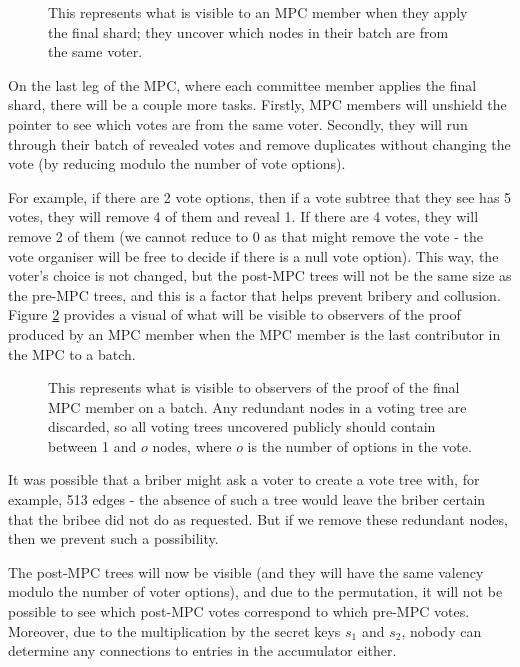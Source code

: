 \documentclass{article}
\begin{document}
\begin{figure}[h!]
        \centering
        
        \caption{This represents what is visible to an MPC member when they apply the final shard; they uncover which nodes in their batch are from the same voter.}
        \label{fig:figure5}
\end{figure}

On the last leg of the MPC, where each committee member applies the final shard, there will be a couple more tasks. Firstly, MPC members will unshield the pointer to see which votes are from the same voter. Secondly, they will run through their batch of revealed votes and remove duplicates without changing the vote (by reducing modulo the number of vote options).

For example, if there are 2 vote options, then if a vote subtree that they see has 5 votes, they will remove 4 of them and reveal 1. If there are 4 votes, they will remove 2 of them (we cannot reduce to 0 as that might remove the vote - the vote organiser will be free to decide if there is a null vote option). This way, the voter's choice is not changed, but the post-MPC trees will not be the same size as the pre-MPC trees, and this is a factor that helps prevent bribery and collusion. Figure \ref{fig:figure6} provides a visual of what will be visible to observers of the proof produced by an MPC member when the MPC member is the last contributor in the MPC to a batch.

\begin{figure}[h!]
        \centering
        
        \caption{This represents what is visible to observers of the proof of the final MPC member on a batch. Any redundant nodes in a voting tree are discarded, so all voting trees uncovered publicly should contain between 1 and $o$ nodes, where $o$ is the number of options in the vote.}
        \label{fig:figure6}
\end{figure}

It was possible that a briber might ask a voter to create a vote tree with, for example, 513 edges - the absence of such a tree would leave the briber certain that the bribee did not do as requested. But if we remove these redundant nodes, then we prevent such a possibility.

The post-MPC trees will now be visible (and they will have the same valency modulo the number of voter options), and due to the permutation, it will not be possible to see which post-MPC votes correspond to which pre-MPC votes. Moreover, due to the multiplication by the secret keys $s_1$ and $s_2$, nobody can determine any connections to entries in the accumulator either.
\end{document}
